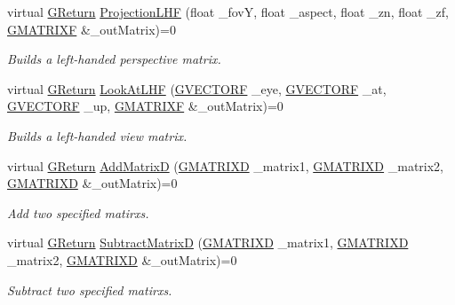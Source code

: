 \begin{DoxyCompactItemize}
virtual \hyperlink{namespaceGW_a67a839e3df7ea8a5c5686613a7a3de21}{G\+Return} \hyperlink{classGW_1_1MATH_1_1GMatrix_a1e46cce75764e9b92a31a84ceb9ffc3b}{Projection\+L\+HF} (float \+\_\+fovY, float \+\_\+aspect, float \+\_\+zn, float \+\_\+zf, \hyperlink{structGW_1_1MATH_1_1GMATRIXF}{G\+M\+A\+T\+R\+I\+XF} \&\+\_\+out\+Matrix)=0
\begin{DoxyCompactList}\small\item\em Builds a left-\/handed perspective matrix. \end{DoxyCompactList}\item 
virtual \hyperlink{namespaceGW_a67a839e3df7ea8a5c5686613a7a3de21}{G\+Return} \hyperlink{classGW_1_1MATH_1_1GMatrix_a33fa9f8f7f8b700f170d1e2654bbfc3b}{Look\+At\+L\+HF} (\hyperlink{structGW_1_1MATH_1_1GVECTORF}{G\+V\+E\+C\+T\+O\+RF} \+\_\+eye, \hyperlink{structGW_1_1MATH_1_1GVECTORF}{G\+V\+E\+C\+T\+O\+RF} \+\_\+at, \hyperlink{structGW_1_1MATH_1_1GVECTORF}{G\+V\+E\+C\+T\+O\+RF} \+\_\+up, \hyperlink{structGW_1_1MATH_1_1GMATRIXF}{G\+M\+A\+T\+R\+I\+XF} \&\+\_\+out\+Matrix)=0
\begin{DoxyCompactList}\small\item\em Builds a left-\/handed view matrix. \end{DoxyCompactList}\item 
virtual \hyperlink{namespaceGW_a67a839e3df7ea8a5c5686613a7a3de21}{G\+Return} \hyperlink{classGW_1_1MATH_1_1GMatrix_a9ae855c7cfbfa08c84bd76a556302bc5}{Add\+MatrixD} (\hyperlink{structGW_1_1MATH_1_1GMATRIXD}{G\+M\+A\+T\+R\+I\+XD} \+\_\+matrix1, \hyperlink{structGW_1_1MATH_1_1GMATRIXD}{G\+M\+A\+T\+R\+I\+XD} \+\_\+matrix2, \hyperlink{structGW_1_1MATH_1_1GMATRIXD}{G\+M\+A\+T\+R\+I\+XD} \&\+\_\+out\+Matrix)=0
\begin{DoxyCompactList}\small\item\em Add two specified matirxs. \end{DoxyCompactList}\item 
virtual \hyperlink{namespaceGW_a67a839e3df7ea8a5c5686613a7a3de21}{G\+Return} \hyperlink{classGW_1_1MATH_1_1GMatrix_a64478828c2d51b739dd116d948cb4ac3}{Subtract\+MatrixD} (\hyperlink{structGW_1_1MATH_1_1GMATRIXD}{G\+M\+A\+T\+R\+I\+XD} \+\_\+matrix1, \hyperlink{structGW_1_1MATH_1_1GMATRIXD}{G\+M\+A\+T\+R\+I\+XD} \+\_\+matrix2, \hyperlink{structGW_1_1MATH_1_1GMATRIXD}{G\+M\+A\+T\+R\+I\+XD} \&\+\_\+out\+Matrix)=0
\begin{DoxyCompactList}\small\item\em Subtract two specified matirxs. \end{DoxyCompactList}\item 

\end{DoxyCompactItemize}
